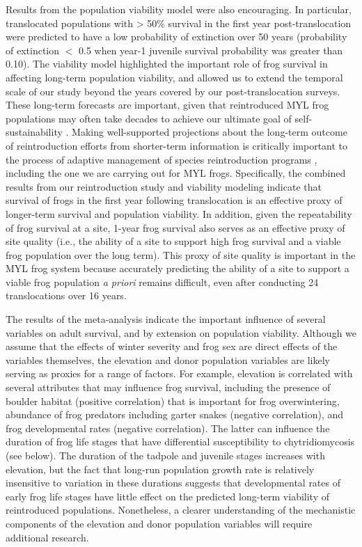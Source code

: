 \documentclass[9pt,twocolumn,twoside,lineno]{pnas-new}
\begin{document}
Results from the population viability model were also encouraging. In
particular, translocated populations with \textgreater{} 50\% survival
in the first year post-translocation were predicted to have a low
probability of extinction over 50 years (probability of extinction \(<\)
0.5 when year-1 juvenile survival probability was greater than 0.10).
The viability model highlighted the important role of frog survival in
affecting long-term population viability, and allowed us to extend the
temporal scale of our study beyond the years covered by our
post-translocation surveys. These long-term forecasts are important,
given that reintroduced MYL frog populations may often take decades to
achieve our ultimate goal of self-sustainability \citep{joseph2018}.
Making well-supported projections about the long-term outcome of
reintroduction efforts from shorter-term information is critically
important to the process of adaptive management of species
reintroduction programs \citep{seddon2007}, including the one we are
carrying out for MYL frogs. Specifically, the combined results from our
reintroduction study and viability modeling indicate that survival of
frogs in the first year following translocation is an effective proxy of
longer-term survival and population viability. In addition, given the
repeatability of frog survival at a site, 1-year frog survival also
serves as an effective proxy of site quality (i.e., the ability of a
site to support high frog survival and a viable frog population over the
long term). This proxy of site quality is important in the MYL frog
system because accurately predicting the ability of a site to support a
viable frog population \emph{a priori} remains difficult, even after
conducting 24 translocations over 16 years.

The results of the meta-analysis indicate the important influence of
several variables on adult survival, and by extension on population
viability. Although we assume that the effects of winter severity and
frog sex are direct effects of the variables themselves, the elevation
and donor population variables are likely serving as proxies for a range
of factors. For example, elevation is correlated with several attributes
that may influence frog survival, including the presence of boulder
habitat (positive correlation) that is important for frog overwintering,
abundance of frog predators including garter snakes (negative
correlation), and frog developmental rates (negative correlation). The
latter can influence the duration of frog life stages that have
differential susceptibility to chytridiomycosis (see below). The
duration of the tadpole and juvenile stages increases with elevation,
but the fact that long-run population growth rate is relatively
insensitive to variation in these durations suggests that developmental
rates of early frog life stages have little effect on the predicted
long-term viability of reintroduced populations. Nonetheless, a clearer
understanding of the mechanistic components of the elevation and donor
population variables will require additional research.
\end{document}
